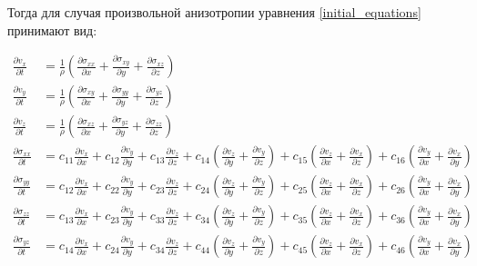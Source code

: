 Тогда для случая произвольной анизотропии уравнения \eqref{initial_equations} принимают вид:
\begin{small}
\begin{align}
	\label{anisotropic_equations}
	\frac{\partial{v_x}}{\partial{t}}&=\frac{1}{\rho}(\frac{\partial{\sigma_{xx}}}{\partial{x}}+\frac{\partial{\sigma_{xy}}}{\partial{y}}+\frac{\partial{\sigma_{xz}}}{\partial{z}})
	\nonumber\\
	\frac{\partial{v_y}}{\partial{t}}&=\frac{1}{\rho}(\frac{\partial{\sigma_{xy}}}{\partial{x}}+\frac{\partial{\sigma_{yy}}}{\partial{y}}+\frac{\partial{\sigma_{yz}}}{\partial{z}})
	\nonumber\\
	\frac{\partial{v_z}}{\partial{t}}&=\frac{1}{\rho}(\frac{\partial{\sigma_{xz}}}{\partial{x}}+\frac{\partial{\sigma_{yz}}}{\partial{y}}+\frac{\partial{\sigma_{zz}}}{\partial{z}})
	\nonumber\\
	\frac{\partial{\sigma_{xx}}}{\partial{t}}&=c_{11}\frac{\partial{v_x}}{\partial{x}}+c_{12}\frac{\partial{v_y}}{\partial{y}}+c_{13}\frac{\partial{v_z}}{\partial{z}}+c_{14}(\frac{\partial{v_z}}{\partial{y}}+\frac{\partial{v_y}}{\partial{z}})+c_{15}(\frac{\partial{v_z}}{\partial{x}}+\frac{\partial{v_x}}{\partial{z}})+c_{16}(\frac{\partial{v_y}}{\partial{x}}+\frac{\partial{v_x}}{\partial{y}})
	\nonumber\\
	\frac{\partial{\sigma_{yy}}}{\partial{t}}&=c_{12}\frac{\partial{v_x}}{\partial{x}}+c_{22}\frac{\partial{v_y}}{\partial{y}}+c_{23}\frac{\partial{v_z}}{\partial{z}}+c_{24}(\frac{\partial{v_z}}{\partial{y}}+\frac{\partial{v_y}}{\partial{z}})+c_{25}(\frac{\partial{v_z}}{\partial{x}}+\frac{\partial{v_x}}{\partial{z}})+c_{26}(\frac{\partial{v_y}}{\partial{x}}+\frac{\partial{v_x}}{\partial{y}})
	\nonumber\\
	\frac{\partial{\sigma_{zz}}}{\partial{t}}&=c_{13}\frac{\partial{v_x}}{\partial{x}}+c_{23}\frac{\partial{v_y}}{\partial{y}}+c_{33}\frac{\partial{v_z}}{\partial{z}}+c_{34}(\frac{\partial{v_z}}{\partial{y}}+\frac{\partial{v_y}}{\partial{z}})+c_{35}(\frac{\partial{v_z}}{\partial{x}}+\frac{\partial{v_x}}{\partial{z}})+c_{36}(\frac{\partial{v_y}}{\partial{x}}+\frac{\partial{v_x}}{\partial{y}})
	\nonumber\\
	\frac{\partial{\sigma_{yz}}}{\partial{t}}&=c_{14}\frac{\partial{v_x}}{\partial{x}}+c_{24}\frac{\partial{v_y}}{\partial{y}}+c_{34}\frac{\partial{v_z}}{\partial{z}}+c_{44}(\frac{\partial{v_z}}{\partial{y}}+\frac{\partial{v_y}}{\partial{z}})+c_{45}(\frac{\partial{v_z}}{\partial{x}}+\frac{\partial{v_x}}{\partial{z}})+c_{46}(\frac{\partial{v_y}}{\partial{x}}+\frac{\partial{v_x}}{\partial{y}})

\end{align}
\end{small}
